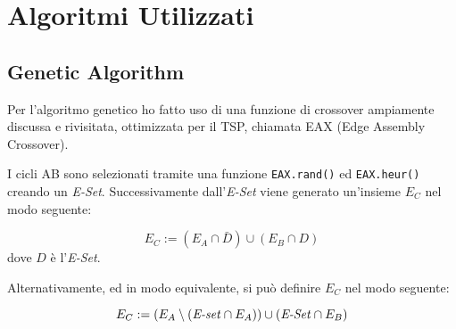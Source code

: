 \documentclass{article}
\newcommand{\mvar}[1]{\textrm{\textit{#1}}}
\newcommand{\ic}[1]{\texttt{#1}}
\begin{document}
\section{Algoritmi Utilizzati}

\subsection{Genetic Algorithm}
Per l'algoritmo genetico ho fatto uso di una funzione di crossover ampiamente
discussa e rivisitata, ottimizzata per il TSP, chiamata EAX (Edge Assembly
Crossover).

I cicli AB sono selezionati tramite una funzione \ic{EAX.rand()} ed
\ic{EAX.heur()} creando un \mvar{E-Set}.
Successivamente dall'\mvar{E-Set} viene generato un'insieme $E_C$ nel modo seguente: 

\begin{equation}
    E_C := (E_A \cap \bar{D}) \cup (E_B \cap D)
\end{equation}
dove $D$ è l'\mvar{E-Set}.

Alternativamente, ed in modo equivalente, si può definire $E_C$ nel modo seguente:

\begin{equation}
    E_C := (E_A \setminus (\mvar{E-set} \cap E_A)) \cup
    (\mvar{E-Set} \cap E_B)
\end{equation}
\end{document}
